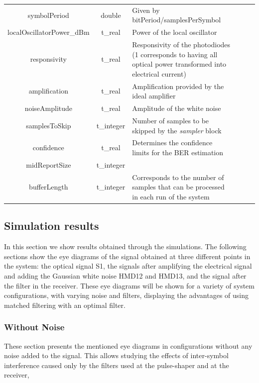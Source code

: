 \begin{table}[H]
\begin{tabular}{|c|c|p{70mm}|ccp{70mm}}
		symbolPeriod & double & Given by bitPeriod/samplesPerSymbol &    \\ \cline{1-3}
		localOscillatorPower\_dBm & t\_real & Power of the local oscillator &    \\ \cline{1-3}
		responsivity & t\_real & Responsivity of the photodiodes (1 corresponds to having all optical power transformed into electrical current) &    \\ \cline{1-3}
		amplification & t\_real & Amplification provided by the ideal amplifier &    \\ \cline{1-3}
		noiseAmplitude & t\_real & Amplitude of the white noise &    \\ \cline{1-3}
		samplesToSkip & t\_integer & Number of samples to be skipped by the \textit{sampler} block &    \\ \cline{1-3}
		confidence & t\_real & Determines the confidence limits for the BER estimation &    \\ \cline{1-3}
		midReportSize & t\_integer &  &    \\ \cline{1-3}
		bufferLength & t\_integer & Corresponds to the number of samples that can be processed in each run of the system &    \\ \cline{1-3}
		\end{tabular}
		\label{table:in_par}
		\end{table}

\subsection*{Simulation results}

In this section we show results obtained through the simulations. The
following sections show the eye diagrams of the signal obtained at three
different points in the system: the optical signal S1, the signals after
amplifying the electrical signal and adding the Gaussian white noise HMD12 and
HMD13, and the signal after the filter in the receiver. These eye diagrams will
be shown for a variety of system configurations, with varying noise and
filters, displaying the advantages of using matched filtering with an optimal
filter.

\subsubsection{Without Noise}

These section presents the mentioned eye diagrams in configurations without any
noise added to the signal. This allows studying the effects of inter-symbol
interference caused only by the filters used at the pulse-shaper and at the
receiver, 

